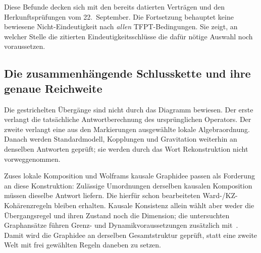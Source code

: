 Diese Befunde decken sich mit den bereits datierten Verträgen
 und den Herkunftsprüfungen vom 22.~September. Die Fortsetzung behauptet keine bewiesene Nicht-Eindeutigkeit nach \emph{allen} TFPT-Bedingungen. Sie zeigt, an welcher Stelle die zitierten Eindeutigkeitsschlüsse die dafür nötige Auswahl noch voraussetzen.

\subsection{Die zusammenhängende Schlusskette und ihre genaue Reichweite}
\begin{center}
\end{center}

Die gestrichelten Übergänge sind nicht durch das Diagramm bewiesen. Der erste verlangt die tatsächliche Antwortberechnung des ursprünglichen Operators. Der zweite verlangt eine aus den Markierungen ausgewählte lokale Algebraordnung. Danach werden Standardmodell, Kopplungen und Gravitation weiterhin an denselben Antworten geprüft; sie werden durch das Wort Rekonstruktion nicht vorweggenommen.

Zuses lokale Komposition und Wolframs kausale Graphidee passen als Forderung an diese Konstruktion: Zulässige Umordnungen derselben kausalen Komposition müssen dieselbe Antwort liefern. Die hierfür schon bearbeiteten Ward-/KZ-Kohärenzregeln bleiben erhalten. Kausale Konsistenz allein wählt aber weder die Übergangsregel und ihren Zustand noch die Dimension; die untersuchten Graphansätze führen Grenz- und Dynamikvoraussetzungen zusätzlich mit~\cite{gorardcausal}. Damit wird die Graphidee an derselben Gesamtstruktur geprüft, statt eine zweite Welt mit frei gewählten Regeln daneben zu setzen.

